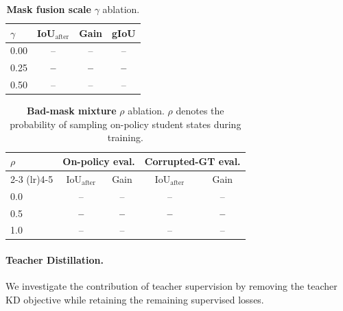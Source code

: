 \begin{table}[t]
    \centering
    \caption{
    \textbf{Mask fusion scale} $\gamma$ ablation.
    }
    \label{tab:ablation_gamma}
    \small
    \begin{tabular}{lccc}
        \toprule
        $\gamma$
        & IoU$_{\mathrm{after}}$
        & Gain
        & gIoU \\
        \midrule
        0.00
        & --
        & --
        & -- \\

        0.25
        & \textbf{--}
        & \textbf{--}
        & \textbf{--} \\

        0.50
        & --
        & --
        & -- \\
        \bottomrule
    \end{tabular}
\end{table}


\begin{table}[t]
    \centering
    \caption{
    \textbf{Bad-mask mixture} $\rho$ ablation.
    $\rho$ denotes the probability of sampling on-policy student states during training.
    }
    \label{tab:ablation_rho}
    \small
    \setlength{\tabcolsep}{4pt}
    \begin{tabular}{lcccc}
        \toprule
        $\rho$
        & \multicolumn{2}{c}{On-policy eval.}
        & \multicolumn{2}{c}{Corrupted-GT eval.} \\
        \cmidrule(lr){2-3}
        \cmidrule(lr){4-5}
        & IoU$_{\mathrm{after}}$
        & Gain
        & IoU$_{\mathrm{after}}$
        & Gain \\
        \midrule
        0.0
        & --
        & --
        & --
        & -- \\

        0.5
        & \textbf{--}
        & \textbf{--}
        & \textbf{--}
        & \textbf{--} \\

        1.0
        & --
        & --
        & --
        & -- \\
        \bottomrule
    \end{tabular}
\end{table}


\paragraph{Teacher Distillation.}
We investigate the contribution of teacher supervision by removing the teacher KD objective while retaining the remaining supervised losses.

